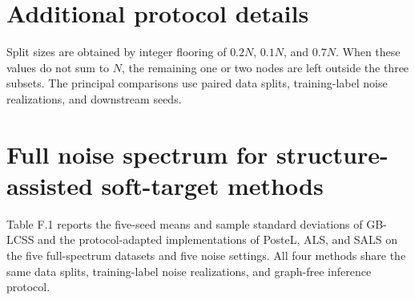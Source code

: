 \documentclass[preprint,12pt]{elsarticle}
\begin{document}
\FloatBarrier
\setcounter{table}{0}
\section{Additional protocol details}\label{sec:E}

Split sizes are obtained by integer flooring of \(0.2N\), \(0.1N\), and \(0.7N\). When these values do not sum to \(N\), the remaining one or two nodes are left outside the three subsets. The principal comparisons use paired data splits, training-label noise realizations, and downstream seeds.

\FloatBarrier
\setcounter{table}{0}
\section{Full noise spectrum for structure-assisted soft-target methods}\label{sec:F}

Table F.1 reports the five-seed means and sample standard deviations of GB-LCSS and the protocol-adapted implementations of PosteL, ALS, and SALS on the five full-spectrum datasets and five noise settings. All four methods share the same data splits, training-label noise realizations, and graph-free inference protocol.
\end{document}
